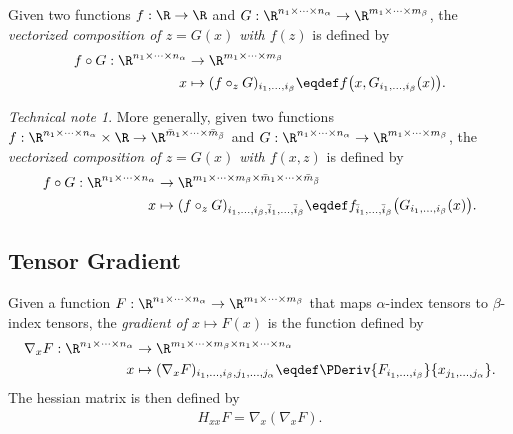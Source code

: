 \documentclass[11pt]{article}
\theoremstyle{remark}
\newtheorem{technical}{Technical note}
\begin{document}
Given two functions $f:\R\to\R$ and $G:\R^{n_1\times\cdots\times n_\alpha}\to\R^{m_1\times\cdots\times
  m_\beta}$, the \emph{vectorized composition of $z=G(x)$ with
  $f(z)$} is defined by
\begin{align*}
  f\circ G:\R^{n_1\times\cdots\times n_\alpha}&\to\R^{m_1\times\cdots\times m_\beta}\\
  x&\mapsto(f\circ_z G)_{i_1,\dots,i_\beta}
  \eqdef f\big(x,G_{i_1,\dots,i_\beta}(x)\big).
\end{align*}

\begin{technical}
  More generally, given two functions $f:\R^{n_1\times\cdots\times n_\alpha}\times\R\to\R^{\bar m_1\times\cdots\times
    \bar m_{\bar \beta}}$ and $G:\R^{n_1\times\cdots\times n_\alpha}\to\R^{m_1\times\cdots\times m_\beta}$, the
  \emph{vectorized composition of $z=G(x)$ with $f(x,z)$} is defined
  by
\begin{align*}
  f\circ G:\R^{n_1\times\cdots\times n_\alpha}&\to\R^{m_1\times\cdots\times m_\beta \times \bar m_1\times\cdots\times \bar m_{\bar \beta}}\\
  x&\mapsto(f\circ_z G)_{i_1,\dots,i_\beta ,\bar i_1,\dots,\bar i_\beta}
  \eqdef f_{\bar i_1,\dots,\bar i_\beta}\big(G_{i_1,\dots,i_\beta}(x)\big).
\end{align*}

\end{technical}

\subsection{Tensor Gradient}

Given a function $F:\R^{n_1\times \cdots\times n_\alpha}\to\R^{m_1\times \cdots\times m_\beta}$ that maps $\alpha$-index
tensors to $\beta$-index tensors, the \emph{gradient of $x\mapsto F(x)$} is the
function defined by
\begin{align*}
  \nabla_x F:\R^{n_1\times \cdots\times n_\alpha}&\to\R^{m_1\times \cdots\times m_\beta\times n_1\times \cdots\times n_\alpha}\\
  x&\mapsto(\nabla_x F)_{i_1,\dots,i_\beta,j_1,\dots,j_\alpha}\eqdef\PDeriv{F_{i_1,\dots,i_\beta}}{x_{j_1,\dots,j_\alpha}}.
\end{align*}
The hessian matrix is then defined by
\begin{align*}
  H_{xx} F=\nabla_x (\nabla_x F).
\end{align*}
\end{document}
